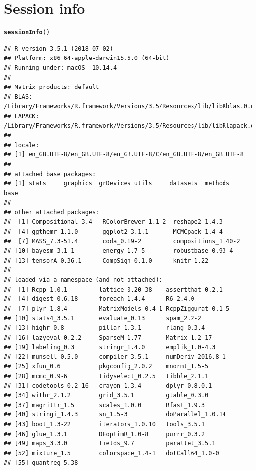 \documentclass{article}\usepackage[]{graphicx}\usepackage[]{color}
\makeatletter
\newcommand{\hlstd}[1]{\textcolor[rgb]{0.345,0.345,0.345}{#1}}%
\newcommand{\hlkwd}[1]{\textcolor[rgb]{0.737,0.353,0.396}{\textbf{#1}}}%
\newenvironment{kframe}{%
 \def\at@end@of@kframe{}%
 \ifinner\ifhmode%
  \def\at@end@of@kframe{\end{minipage}}%
  \begin{minipage}{\columnwidth}%
 \fi\fi%
 \def\FrameCommand##1{\hskip\@totalleftmargin \hskip-\fboxsep
 \colorbox{shadecolor}{##1}\hskip-\fboxsep
     \hskip-\linewidth \hskip-\@totalleftmargin \hskip\columnwidth}%
 \MakeFramed {\advance\hsize-\width
   \@totalleftmargin\z@ \linewidth\hsize
   \@setminipage}}%
 {\par\unskip\endMakeFramed%
 \at@end@of@kframe}
\newenvironment{knitrout}{}{} %
\makeatother
\begin{document}
\clearpage

\clearpage
\printbibliography

\clearpage
\section{Session info}
\begin{knitrout}
\color{fgcolor}\begin{kframe}
\begin{alltt}
  \hlkwd{sessionInfo}\hlstd{()}
\end{alltt}
\begin{verbatim}
## R version 3.5.1 (2018-07-02)
## Platform: x86_64-apple-darwin15.6.0 (64-bit)
## Running under: macOS  10.14.4
## 
## Matrix products: default
## BLAS: /Library/Frameworks/R.framework/Versions/3.5/Resources/lib/libRblas.0.dylib
## LAPACK: /Library/Frameworks/R.framework/Versions/3.5/Resources/lib/libRlapack.dylib
## 
## locale:
## [1] en_GB.UTF-8/en_GB.UTF-8/en_GB.UTF-8/C/en_GB.UTF-8/en_GB.UTF-8
## 
## attached base packages:
## [1] stats     graphics  grDevices utils     datasets  methods   base     
## 
## other attached packages:
##  [1] Compositional_3.4   RColorBrewer_1.1-2  reshape2_1.4.3     
##  [4] ggthemr_1.1.0       ggplot2_3.1.1       MCMCpack_1.4-4     
##  [7] MASS_7.3-51.4       coda_0.19-2         compositions_1.40-2
## [10] bayesm_3.1-1        energy_1.7-5        robustbase_0.93-4  
## [13] tensorA_0.36.1      CompSign_0.1.0      knitr_1.22         
## 
## loaded via a namespace (and not attached):
##  [1] Rcpp_1.0.1         lattice_0.20-38    assertthat_0.2.1  
##  [4] digest_0.6.18      foreach_1.4.4      R6_2.4.0          
##  [7] plyr_1.8.4         MatrixModels_0.4-1 RcppZiggurat_0.1.5
## [10] stats4_3.5.1       evaluate_0.13      spam_2.2-2        
## [13] highr_0.8          pillar_1.3.1       rlang_0.3.4       
## [16] lazyeval_0.2.2     SparseM_1.77       Matrix_1.2-17     
## [19] labeling_0.3       stringr_1.4.0      emplik_1.0-4.3    
## [22] munsell_0.5.0      compiler_3.5.1     numDeriv_2016.8-1 
## [25] xfun_0.6           pkgconfig_2.0.2    mnormt_1.5-5      
## [28] mcmc_0.9-6         tidyselect_0.2.5   tibble_2.1.1      
## [31] codetools_0.2-16   crayon_1.3.4       dplyr_0.8.0.1     
## [34] withr_2.1.2        grid_3.5.1         gtable_0.3.0      
## [37] magrittr_1.5       scales_1.0.0       Rfast_1.9.3       
## [40] stringi_1.4.3      sn_1.5-3           doParallel_1.0.14 
## [43] boot_1.3-22        iterators_1.0.10   tools_3.5.1       
## [46] glue_1.3.1         DEoptimR_1.0-8     purrr_0.3.2       
## [49] maps_3.3.0         fields_9.7         parallel_3.5.1    
## [52] mixture_1.5        colorspace_1.4-1   dotCall64_1.0-0   
## [55] quantreg_5.38
\end{verbatim}
\end{kframe}
\end{knitrout}
\end{document}
